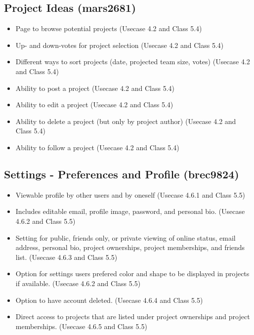 \documentclass[11pt]{report}
\begin{document}
    \subsection{Project Ideas (mars2681)}
        \begin{itemize}
            \item Page to browse potential projects (Usecase 4.2 and Class 5.4)
            \item Up- and down-votes for project selection (Usecase 4.2 and Class 5.4)
            \item Different ways to sort projects (date, projected team size, votes) (Usecase 4.2 and Class 5.4)
            \item Ability to post a project (Usecase 4.2 and Class 5.4)
            \item Ability to edit a project (Usecase 4.2 and Class 5.4)
            \item Ability to delete a project (but only by project author) (Usecase 4.2 and Class 5.4)
            \item Ability to follow a project (Usecase 4.2 and Class 5.4)
        \end{itemize}
    \subsection{Settings - Preferences and Profile (brec9824)}
        \begin{itemize}
            \item Viewable profile by other users and by oneself (Usecase 4.6.1 and Class 5.5)
            \item Includes editable email, profile image, password, and personal bio. (Usecase 4.6.2 and Class 5.5)
            \item Setting for public, friends only, or private viewing of online status, email address, personal bio, project ownerships, project memberships, and friends list. (Usecase 4.6.3 and Class 5.5)
            \item Option for settings users prefered color and shape to be displayed in projects if available. (Usecase 4.6.2 and Class 5.5)
            \item Option to have account deleted. (Usecase 4.6.4 and Class 5.5)
        	\item Direct access to projects that are listed under project ownerships and project memberships. (Usecase 4.6.5 and Class 5.5)
        \end{itemize}
\end{document}
